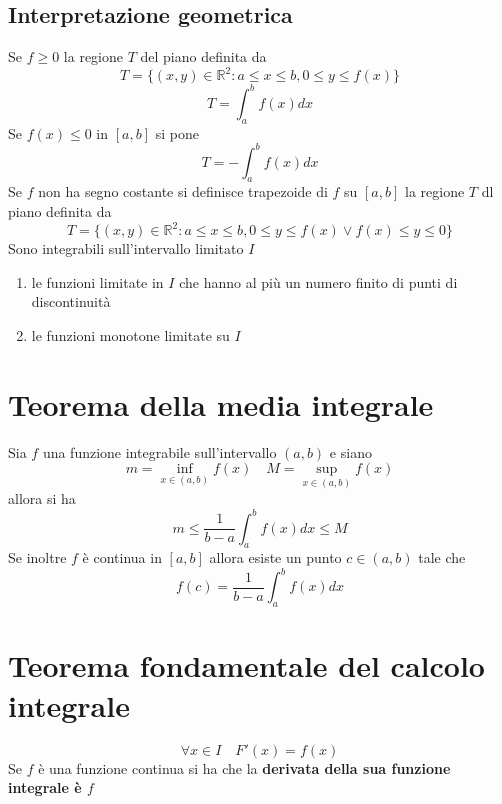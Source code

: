 \documentclass[12pt, a4paper]{report}
\begin{document}
    \subsection{Interpretazione geometrica}
    Se $f\geq 0$ la regione $T$ del piano definita da
    \begin{equation*}
        T=\{(x,y)\in \mathbb{R}^{2}:a\leq x\leq b,0\leq y\leq f(x)\}
    \end{equation*}
    \begin{equation*}
        T = \int_{a}^{b} f(x)dx
    \end{equation*}
    Se $f(x)\leq 0$ in $[a,b]$ si pone
    \begin{equation*}
        T=-\int_{a}^{b}f(x)dx
    \end{equation*}
    Se $f$ non ha segno costante si definisce trapezoide di $f$ su $[a,b]$ la regione $T$ dl piano definita da
    \begin{equation*}
        T=\{(x,y)\in \mathbb{R}^{2}:a\leq x\leq b,0\leq y\leq f(x) \lor f(x)\leq y\leq 0\}
    \end{equation*}
    Sono integrabili sull'intervallo limitato $I$
    \begin{enumerate}
        \item le funzioni limitate in $I$ che hanno al più un numero finito di punti di discontinuità
        \item le funzioni monotone limitate su $I$
    \end{enumerate}
    \section{Teorema della media integrale}
    Sia $f$ una funzione integrabile sull'intervallo $(a,b)$ e siano
    \begin{equation*}
        m=\inf_{x\in (a,b)}f(x) \quad M=\sup_{x\in (a,b)}f(x)
    \end{equation*}
    allora si ha
    \begin{equation*}
        m\leq\frac{1}{b-a}\int_{a}^{b}f(x)dx\leq M
    \end{equation*}
    Se inoltre $f$ è continua in $[a,b]$ allora esiste un punto $c\in (a,b)$ tale che
    \begin{equation*}
        f(c)=\frac{1}{b-a}\int_{a}^{b}f(x)dx
    \end{equation*}
    \section{Teorema fondamentale del calcolo integrale}
    \begin{equation*}
        \forall x \in I \quad F'(x)=f(x)
    \end{equation*}
    Se $f$ è una funzione continua si ha che la \textbf{derivata della sua funzione integrale è $f$}
\end{document}
